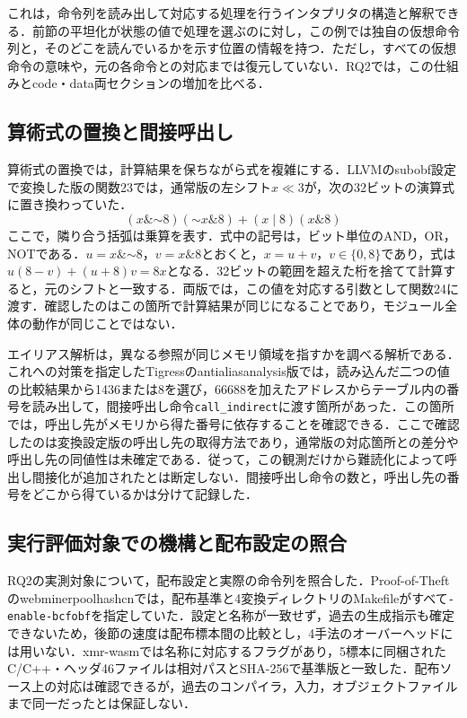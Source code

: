 \documentclass[submit,techrep]{ipsj}
\begin{document}
これは，命令列を読み出して対応する処理を行うインタプリタの構造と解釈できる．前節の平坦化が状態の値で処理を選ぶのに対し，この例では独自の仮想命令列と，そのどこを読んでいるかを示す位置の情報を持つ．ただし，すべての仮想命令の意味や，元の各命令との対応までは復元していない．RQ2では，この仕組みとcode・data両セクションの増加を比べる．

\subsection{算術式の置換と間接呼出し}
算術式の置換では，計算結果を保ちながら式を複雑にする．LLVMのsubobf設定で変換した版の関数23では，通常版の左シフト$x\ll3$が，次の32ビットの演算式に置き換わっていた．
\[
(x\mathbin{\&}\mathord{\sim}8)(\mathord{\sim}x\mathbin{\&}8)
+(x\mathbin{|}8)(x\mathbin{\&}8)
\]
ここで，隣り合う括弧は乗算を表す．式中の記号は，ビット単位のAND，OR，NOTである．$u=x\mathbin{\&}\mathord{\sim}8$，$v=x\mathbin{\&}8$とおくと，$x=u+v$，$v\in\{0,8\}$であり，式は$u(8-v)+(u+8)v=8x$となる．32ビットの範囲を超えた桁を捨てて計算すると，元のシフトと一致する．両版では，この値を対応する引数として関数24に渡す．確認したのはこの箇所で計算結果が同じになることであり，モジュール全体の動作が同じことではない．

エイリアス解析は，異なる参照が同じメモリ領域を指すかを調べる解析である．これへの対策を指定したTigressのantialiasanalysis版では，読み込んだ二つの値の比較結果から1436または8を選び，66688を加えたアドレスからテーブル内の番号を読み出して，間接呼出し命令\texttt{call\_indirect}に渡す箇所があった．この箇所では，呼出し先がメモリから得た番号に依存することを確認できる．ここで確認したのは変換設定版の呼出し先の取得方法であり，通常版の対応箇所との差分や呼出し先の同値性は未確定である．従って，この観測だけから難読化によって呼出し間接化が追加されたとは断定しない．間接呼出し命令の数と，呼出し先の番号をどこから得ているかは分けて記録した．

\subsection{実行評価対象での機構と配布設定の照合}
\label{sec:proof-mechanisms}
RQ2の実測対象について，配布設定と実際の命令列を照合した．Proof-of-Theftのwebminerpoolhashcnでは，配布基準と4変換ディレクトリのMakefileがすべて\texttt{-enable-bcfobf}を指定していた．設定と名称が一致せず，過去の生成指示も確定できないため，後節の速度は配布標本間の比較とし，4手法のオーバーヘッドには用いない．xmr-wasmでは名称に対応するフラグがあり，5標本に同梱されたC/C++・ヘッダ46ファイルは相対パスとSHA-256で基準版と一致した．配布ソース上の対応は確認できるが，過去のコンパイラ，入力，オブジェクトファイルまで同一だったとは保証しない．
\end{document}
